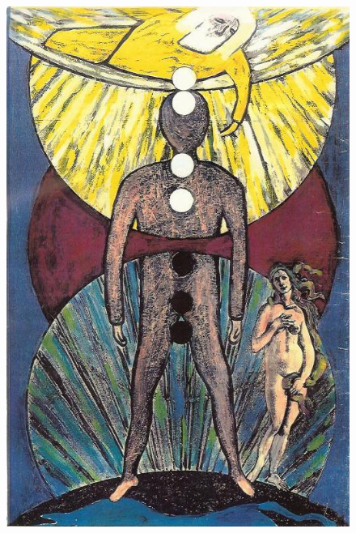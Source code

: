 \documentclass[landscape,twocolumn,letterpaper]{article}
\begin{document}

\newpage\thispagestyle{empty}

\begin{figure} \centering
  \includegraphics[height=1.1\textheight,bb= 0 0 527 798]{back.jpg}
\end{figure}
\end{document}
